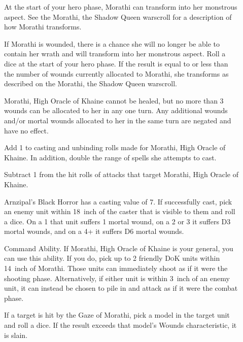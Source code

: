 \begin{description}
    \item [] At the
        start of your hero phase, Morathi can transform into her monstrous
        aspect. See the Morathi, the Shadow Queen warscroll for
        a description of how Morathi transforms.
    \item [] If Morathi is
        wounded, there is a chance she will no longer be able to contain her
        wrath and will transform into her monstrous aspect. Roll a dice at the
        start of your hero phase. If the result is equal to or less than the
        number of wounds currently allocated to Morathi, she transforms as
        described on the Morathi, the Shadow Queen warscroll.
    \item []
        Morathi, High Oracle of Khaine cannot be healed, but no more than
        3 wounds can be allocated to her in any one turn. Any additional wounds
        and/or mortal wounds allocated to her in the same turn are negated and
        have no effect.
    \item [] Add 1 to casting and
        unbinding rolls made for Morathi, High Oracle of Khaine. In addition,
        double the range of spells she attempts to cast.
    \item [] Subtract 1 from the
        hit rolls of attacks that target Morathi, High Oracle of Khaine.
    \item []
        Arnzipal's Black Horror has a casting value of 7. If successfully cast,
        pick an enemy unit within 18~inch of the caster that is visible to them
        and roll a dice. On a 1 that unit suffers 1 mortal wound, on a 2 or
        3 it suffers D3 mortal wounds, and on a 4+ it suffers D6 mortal
        wounds.
    \item []
        Command Ability. If Morathi, High Oracle of Khaine is your general, you
        can use this ability. If you do, pick up to 2 friendly \textsc{DoK} units within
        14~inch of Morathi. Those units can immediately shoot as if it were the
        shooting phase. Alternatively, if either unit is within
        3~inch of an enemy unit, it can instead be chosen to pile in and attack
        as if it were the combat phase.
   \item [] If a target is hit by the
        Gaze of Morathi, pick a model in the target unit and roll a dice. If the
        result exceeds that model's Wounds characteristic, it is slain.
\end{description}

